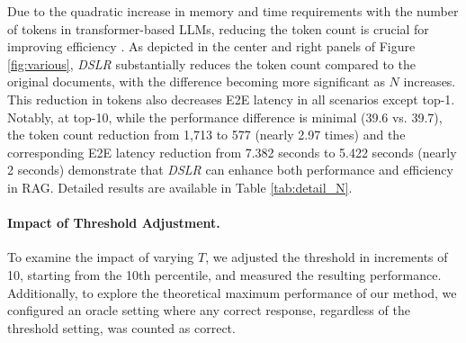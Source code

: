 Due to the quadratic increase in memory and time requirements with the number of tokens in transformer-based LLMs, reducing the token count is crucial for improving efficiency \cite{attention}. As depicted in the center and right panels of Figure \ref{fig:various}, \textit{DSLR} substantially reduces the token count compared to the original documents, with the difference becoming more significant as \(N\) increases. This reduction in tokens also decreases E2E latency in all scenarios except top-1. Notably, at top-10, while the performance difference is minimal (39.6 vs. 39.7), the token count reduction from 1,713 to 577 (nearly 2.97 times) and the corresponding E2E latency reduction from 7.382 seconds to 5.422 seconds (nearly 2 seconds) demonstrate that \textit{DSLR} can enhance both performance and efficiency in RAG. Detailed results are available in Table \ref{tab:detail_N}.



\paragraph{Impact of Threshold Adjustment.}
To examine the impact of varying \( T \), we adjusted the threshold in increments of 10, starting from the 10th percentile, and measured the resulting performance. Additionally, to explore the theoretical maximum performance of our method, we configured an oracle setting where any correct response, regardless of the threshold setting, was counted as correct.

